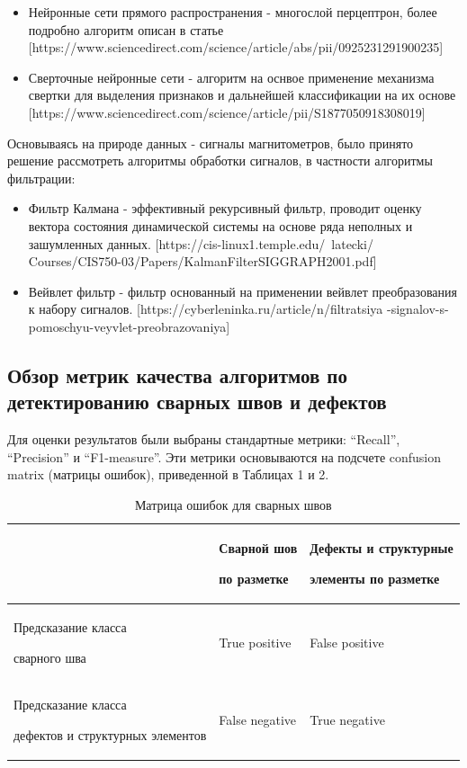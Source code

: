 \documentclass[a4paper,article,14pt]{extarticle}
\begin{document}
\begin{itemize}
    \item Нейронные сети прямого распространения - многослой перцептрон, более подробно алгоритм описан в статье 
    [https://www.sciencedirect.com/science/article/abs/pii/0925231291900235]
    \item Сверточные нейронные сети - алгоритм на оснвое применение механизма свертки для выделения 
    признаков и дальнейшей классификации на их основе [https://www.sciencedirect.com/science/article/pii/S1877050918308019]
\end{itemize}

Основываясь на природе данных - сигналы магнитометров, было принято решение рассмотреть алгоритмы  обработки сигналов, в частности алгоритмы фильтрации:

\begin{itemize}
    \item Фильтр Калмана - эффективный рекурсивный фильтр, проводит оценку вектора состояния динамической системы 
    на основе ряда неполных и зашумленных данных. [https://cis-linux1.temple.edu/~latecki/ Courses/CIS750-03/Papers/KalmanFilterSIGGRAPH2001.pdf]
    \item Вейвлет фильтр - фильтр основанный на применении вейвлет преобразования к набору сигналов.
    [https://cyberleninka.ru/article/n/filtratsiya -signalov-s-pomoschyu-veyvlet-preobrazovaniya]
\end{itemize}

\subsection{Обзор метрик качества алгоритмов по детектированию сварных швов и дефектов}
Для оценки результатов были выбраны стандартные метрики: “Recall”,  “Precision” и “F1-measure”.
Эти метрики основываются на подсчете confusion matrix (матрицы ошибок), приведенной в Таблицах 1 и 2.

\begin{center}
\begin{longtable}{|p{5cm}|p{5cm}|p{6cm}|}
    \caption{Матрица ошибок для сварных швов}\\\hline
     & Сварной шов \par по разметке & Дефекты и структурные \par элементы по разметке \\ \hline
    Предсказание класса\par сварного шва & True positive & False positive \\ \hline
    Предсказание класса \par дефектов и структурных элементов & False negative & True negative \\ \hline
\end{longtable}
\end{center}
\end{document}
